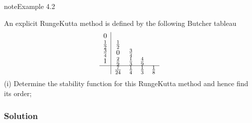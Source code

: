 \documentclass[letterpaper,10pt,english]{jupyterBook}
\begin{document}
\begin{sphinxadmonition}{note}{Example 4.2}

\sphinxAtStartPar
An explicit Runge\sphinxhyphen{}Kutta method is defined by the following Butcher tableau
\begin{align*}\begin{array}{c|cccc}
0 &  &  &  & \\
\frac{1}{2} & \frac{1}{2} &  &  & \\
\frac{3}{4} & 0 & \frac{3}{4} &  & \\
1 & \frac{2}{9} & \frac{1}{3} & \frac{4}{9} & \\ 
\hline
& \frac{7}{24} & \frac{1}{4} & \frac{1}{3} & \frac{1}{8}
\end{array}\end{align*}
\sphinxAtStartPar
(i) Determine the stability function for this Runge\sphinxhyphen{}Kutta method and hence find its order;
\subsubsection*{Solution}


\end{sphinxadmonition}
\end{document}
